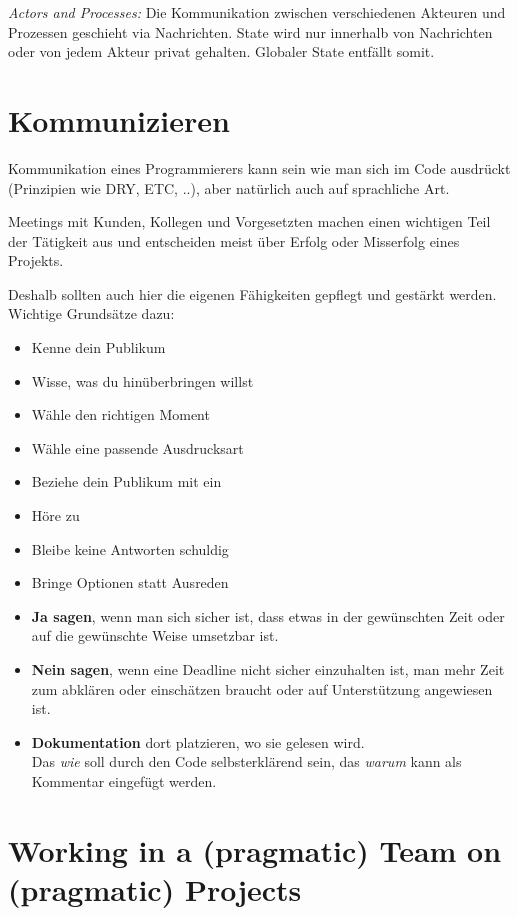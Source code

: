 \documentclass[10pt, oneside]{article}
\begin{document}
\emph{Actors and Processes: } Die Kommunikation zwischen verschiedenen Akteuren und Prozessen geschieht via Nachrichten. State wird nur innerhalb von Nachrichten oder von jedem Akteur privat gehalten. 
Globaler State entfällt somit. 

\section{Kommunizieren}
Kommunikation eines Programmierers kann sein wie man sich im Code ausdrückt (Prinzipien wie DRY, ETC, ..), aber natürlich auch auf sprachliche Art.

Meetings mit Kunden, Kollegen und Vorgesetzten machen einen wichtigen Teil der Tätigkeit aus und entscheiden meist über Erfolg oder Misserfolg eines Projekts.

Deshalb sollten auch hier die eigenen Fähigkeiten gepflegt und gestärkt werden. Wichtige Grundsätze dazu:

\begin{itemize}[itemsep=4pt]
    \item Kenne dein Publikum
    \item Wisse, was du hinüberbringen willst
    \item Wähle den richtigen Moment
    \item Wähle eine passende Ausdrucksart
    \item Beziehe dein Publikum mit ein
    \item Höre zu
    \item Bleibe keine Antworten schuldig
    \item Bringe Optionen statt Ausreden
    \item \textbf{Ja sagen}, wenn man sich sicher ist, dass etwas in der gewünschten Zeit oder auf die gewünschte Weise umsetzbar ist. 
    \item \textbf{Nein sagen}, wenn eine Deadline nicht sicher einzuhalten ist, man mehr Zeit zum abklären oder einschätzen braucht oder auf Unterstützung angewiesen ist.
    \item \textbf{Dokumentation} dort platzieren, wo sie gelesen wird. \\ Das \emph{wie} soll durch den Code selbsterklärend sein, das \emph{warum} kann als Kommentar eingefügt werden.
\end{itemize}


\section{Working in a (pragmatic) Team on (pragmatic) Projects}
\end{document}
